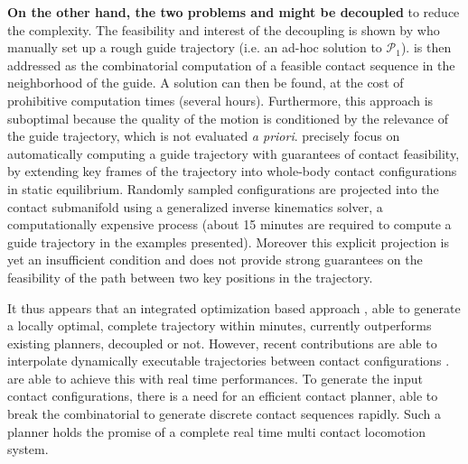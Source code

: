 \textbf{On the other hand, the two problems \Pa and \Pb might be decoupled} to reduce the complexity. The feasibility and interest of the decoupling is shown by \citeauthor{DBLP:conf/iser/EscandeKMG08} who manually set up a rough guide trajectory (i.e. an ad-hoc solution to $\mathcal{P}_1$). \Pb  is then addressed as the combinatorial computation of a feasible contact sequence in the neighborhood of the guide. A solution can then be found, at the cost of prohibitive computation times (several hours). Furthermore, this approach is suboptimal because the quality of the motion is conditioned by the relevance of the guide trajectory,  which is not evaluated \textit{a priori}. \citeauthor{Bouyarmane2009} precisely focus on automatically computing a guide trajectory with guarantees of contact feasibility, by extending key frames of the trajectory into whole-body contact configurations in static equilibrium. Randomly sampled configurations are projected into the contact submanifold using a generalized inverse kinematics solver, a computationally expensive process (about 15 minutes are required to compute a guide trajectory in the examples presented). Moreover this explicit projection is yet an insufficient condition and does not provide strong guarantees on the feasibility of the path between two key positions in the trajectory.

It thus appears that an integrated optimization based approach \citep{Mordatch:2012:DCB:2185520.2185539}, able to generate a locally optimal, complete trajectory within minutes, currently outperforms
existing planners, decoupled or not. However, recent contributions are able to interpolate dynamically executable 
trajectories between contact configurations \citep{herzog2015trajectory, Carpentier2016}. \citeauthor{Carpentier2016} are able to achieve this with real time performances.
To generate the input contact configurations, there is a need for an efficient contact planner, able to break the combinatorial to generate discrete contact sequences rapidly. 
Such a planner holds the promise of a complete real time multi contact locomotion system.

